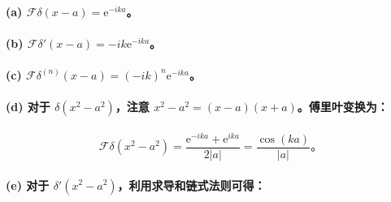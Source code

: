 \paragraph{\texorpdfstring{(a)
\(\mathcal{F}\delta(x - a) = \mathrm{e}^{- ika}\)。}{(a) \textbackslash mathcal\{F\}\textbackslash delta(x - a) = \textbackslash mathrm\{e\}\^{}\{- ika\}。}}\label{a-mathcalfdeltax-a-mathrme-i-k-a}

\paragraph{\texorpdfstring{(b)
\(\mathcal{F}\delta\prime(x - a) = - ik\mathrm{e}^{- ika}\)。}{(b) \textbackslash mathcal\{F\}\textbackslash delta\textbackslash prime(x - a) = - ik\textbackslash mathrm\{e\}\^{}\{- ika\}。}}\label{b-mathcalfdeltax-a--i-k-mathrme-i-k-a}

\paragraph{\texorpdfstring{(c)
\(\mathcal{F}\delta^{(n)}(x - a) = ( - ik)^{n}\mathrm{e}^{- ika}\)。}{(c) \textbackslash mathcal\{F\}\textbackslash delta\^{}\{(n)\}(x - a) = ( - ik)\^{}\{n\}\textbackslash mathrm\{e\}\^{}\{- ika\}。}}\label{c-mathcalfdeltanx-a--i-kn-mathrme-i-k-a}

\paragraph{\texorpdfstring{(d) 对于
\(\delta\left( x^{2} - a^{2} \right)\)，注意
\(x^{2} - a^{2} = (x - a)(x + a)\)。傅里叶变换为：}{(d) 对于 \textbackslash delta\textbackslash left( x\^{}\{2\} - a\^{}\{2\} \textbackslash right)，注意 x\^{}\{2\} - a\^{}\{2\} = (x - a)(x + a)。傅里叶变换为：}}\label{d-ux5bf9ux4e8e-deltax2-a2ux6ce8ux610f-x2-a2-x-axaux5085ux91ccux53f6ux53d8ux6362ux4e3a}

\[\mathcal{F}\delta\left( x^{2} - a^{2} \right) = \frac{\mathrm{e}^{- ika} + \mathrm{e}^{ika}}{2|a|} = \frac{\cos(ka)}{|a|}。\]

\paragraph{\texorpdfstring{(e) 对于
\(\delta\prime\left( x^{2} - a^{2} \right)\)，利用求导和链式法则可得：}{(e) 对于 \textbackslash delta\textbackslash prime\textbackslash left( x\^{}\{2\} - a\^{}\{2\} \textbackslash right)，利用求导和链式法则可得：}}\label{e-ux5bf9ux4e8e-deltax2-a2ux5229ux7528ux6c42ux5bfcux548cux94feux5f0fux6cd5ux5219ux53efux5f97}

